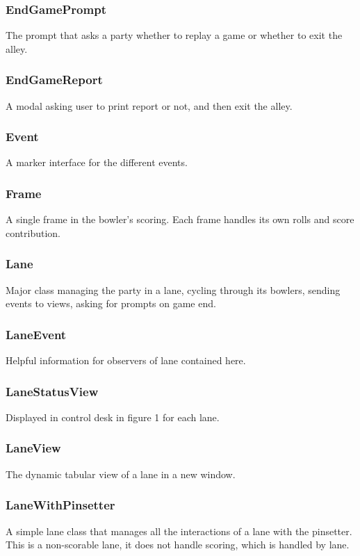 \subsubsection{EndGamePrompt}
The prompt that asks a party whether to replay a game or whether to exit the alley.

\subsubsection{EndGameReport}
A modal asking user to print report or not, and then exit the alley.

\subsubsection{Event}
A marker interface for the different events.

\subsubsection{Frame}
A single frame in the bowler's scoring. Each frame handles its own rolls and score contribution.

\subsubsection{Lane}
Major class managing the party in a lane, cycling through its bowlers, sending events to views, asking for prompts on game end.

\subsubsection{LaneEvent}
Helpful information for observers of lane contained here.

\subsubsection{LaneStatusView}
Displayed in control desk in figure 1 for each lane.

\subsubsection{LaneView}
The dynamic tabular view of a lane in a new window.

\subsubsection{LaneWithPinsetter}
A simple lane class that manages all the interactions of a lane with the pinsetter. This is a non-scorable lane, it does not handle scoring, which is handled by lane.

